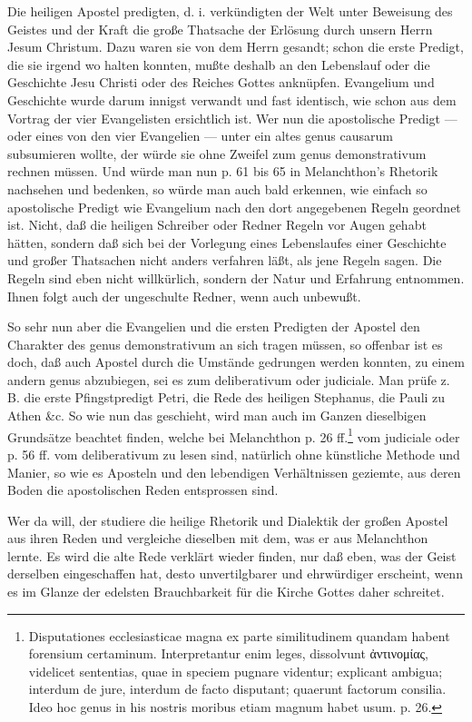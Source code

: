 Die heiligen Apostel predigten, d. i. verkündigten der Welt unter Beweisung des Geistes und der Kraft die große Thatsache der Erlösung durch unsern Herrn Jesum Christum. Dazu waren sie von dem Herrn gesandt; schon
die erste Predigt, die sie irgend wo halten konnten, mußte deshalb an den Lebenslauf oder die Geschichte Jesu Christi oder des Reiches Gottes anknüpfen. Evangelium und Geschichte wurde darum innigst verwandt und fast identisch, wie schon aus dem Vortrag der vier Evangelisten ersichtlich ist. Wer nun die apostolische Predigt — oder eines von den vier Evangelien — unter ein altes genus causarum subsumieren wollte, der würde sie ohne Zweifel zum genus demonstrativum rechnen müssen. Und würde man nun p. 61 bis 65 in Melanchthon’s Rhetorik nachsehen und bedenken, so würde man auch bald erkennen, wie einfach so apostolische Predigt wie Evangelium nach den dort angegebenen Regeln geordnet ist. Nicht, daß die heiligen Schreiber oder Redner Regeln vor Augen gehabt hätten, sondern daß sich bei der Vorlegung eines Lebenslaufes einer Geschichte und großer Thatsachen nicht anders verfahren läßt, als jene Regeln sagen. Die Regeln sind eben nicht willkürlich, sondern der Natur und Erfahrung entnommen. Ihnen folgt auch der ungeschulte Redner, wenn auch unbewußt.

So sehr nun aber die Evangelien und die ersten Predigten der Apostel den Charakter des genus demonstrativum an sich tragen müssen, so offenbar ist es doch, daß auch Apostel durch die Umstände gedrungen werden konnten, zu einem andern genus abzubiegen, sei es zum deliberativum oder judiciale. Man prüfe z. B. die erste Pfingstpredigt Petri, die Rede des heiligen Stephanus, die Pauli zu Athen \&c. So wie nun das geschieht, wird man auch im Ganzen dieselbigen
Grundsätze beachtet finden, welche bei Melanchthon p. 26 ff.\footnote{Disputationes ecclesiasticae magna ex parte similitudinem quandam habent forensium certaminum. Interpretantur enim leges, dissolvunt ἀντινομίας, videlicet sententias, quae in speciem pugnare videntur; explicant ambigua; interdum de jure, interdum de facto disputant; quaerunt factorum consilia. Ideo hoc genus in his nostris moribus etiam magnum habet usum. p. 26.} vom judiciale oder p. 56 ff. vom deliberativum zu lesen sind, natürlich ohne künstliche Methode und Manier, so wie es Aposteln und den lebendigen Verhältnissen geziemte, aus deren Boden die apostolischen Reden entsprossen sind.

Wer da will, der studiere die heilige Rhetorik und Dialektik der großen Apostel aus ihren Reden und vergleiche dieselben mit dem, was er aus Melanchthon lernte. Es wird die alte Rede verklärt wieder finden, nur daß eben, was der Geist derselben eingeschaffen hat, desto unvertilgbarer und ehrwürdiger erscheint, wenn es im Glanze der edelsten Brauchbarkeit für die Kirche Gottes daher schreitet.

